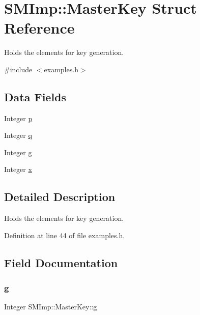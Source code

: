 \hypertarget{structSMImp_1_1MasterKey}{}\section{S\+M\+Imp\+:\+:Master\+Key Struct Reference}
\label{structSMImp_1_1MasterKey}


Holds the elements for key generation.  




{\ttfamily \#include $<$examples.\+h$>$}

\subsection*{Data Fields}
\begin{DoxyCompactItemize}
\item 
Integer \hyperlink{structSMImp_1_1MasterKey_a02c412cc3787c75f2c4ddc1ac5f5e97a}{p}
\item 
Integer \hyperlink{structSMImp_1_1MasterKey_abe015bcc8fd5562a2b9d9dd55cc69a02}{q}
\item 
Integer \hyperlink{structSMImp_1_1MasterKey_a82597ad35098625065e9bd7d0983e9bd}{g}
\item 
Integer \hyperlink{structSMImp_1_1MasterKey_a8435c91db233b14df5634fd9210ad1de}{x}
\end{DoxyCompactItemize}


\subsection{Detailed Description}
Holds the elements for key generation. 

Definition at line 44 of file examples.\+h.



\subsection{Field Documentation}
\mbox{\label{structSMImp_1_1MasterKey_a82597ad35098625065e9bd7d0983e9bd}} 
\subsubsection{\texorpdfstring{g}{g}}
{\footnotesize\ttfamily Integer S\+M\+Imp\+::\+Master\+Key\+::g}



